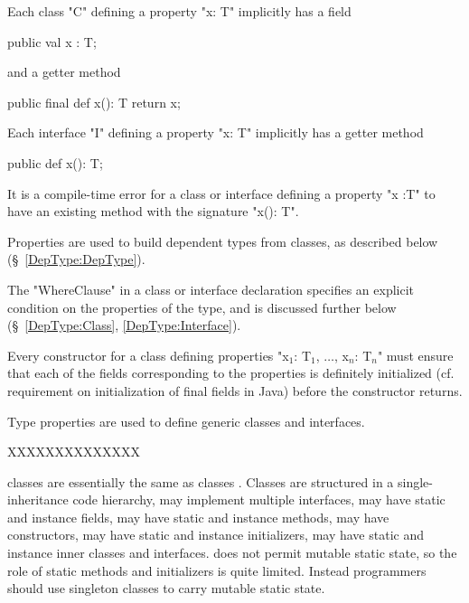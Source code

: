 Each class \xcd"C" defining a property \xcd"x: T" implicitly has a field

\begin{xten}
public val x : T;
\end{xten} 

\noindent and a getter method

\begin{xten}
public final def x(): T { return x; }
\end{xten}

\noindent Each interface \xcd"I" defining a property \xcd"x: T"
implicitly has a getter method

\begin{xten}
public def x(): T;
\end{xten}

\begin{staticrule*}
It is a compile-time error for a class or
interface defining a property \xcd"x :T" to have an existing method with
the signature \xcd"x(): T".
\end{staticrule*}


Properties are used to build dependent types from classes, as
described below (\S~\ref{DepType:DepType}).

The \xcd"WhereClause" in a class or interface declaration specifies an
explicit condition on the properties of the type, and is discussed further
below (\S~\ref{DepType:Class}, \ref{DepType:Interface}).

\begin{staticrule*}
     Every constructor for a class defining
   properties \xcdmath"x$_1$: T$_1$, $\ldots$, x$_n$: T$_n$" must ensure that each of the fields
   corresponding to the properties is definitely initialized
   (cf. requirement on initialization of final fields in Java) before the
   constructor returns.
\end{staticrule*}

Type properties are used to define generic classes and
interfaces.

XXXXXXXXXXXXXX


{}\Xten{} classes are essentially the same as \java{} classes \cite[\S 8]{jls2}. Classes are structured in a single-inheritance code
hierarchy, may implement multiple interfaces, may have static and
instance fields, may have static and instance methods, may have
constructors, may have static and instance initializers, may have
static and instance inner classes and interfaces. \Xten{} does not
permit mutable static state, so the role of static methods and
initializers is quite limited. Instead programmers should use
singleton classes to carry mutable static state.

